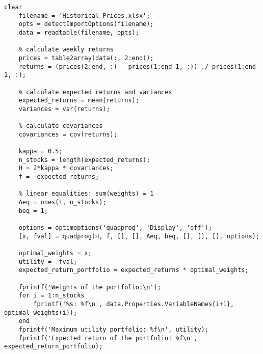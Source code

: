 \documentclass[12pt]{article}
\begin{document}
\begin{lstlisting}[label=lst:c,
    caption=Question c)]
    clear
    filename = 'Historical Prices.xlsx';
    opts = detectImportOptions(filename);
    data = readtable(filename, opts);
    
    % calculate weekly returns
    prices = table2array(data(:, 2:end));
    returns = (prices(2:end, :) - prices(1:end-1, :)) ./ prices(1:end-1, :);
    
    % calculate expected returns and variances
    expected_returns = mean(returns);
    variances = var(returns);
    
    % calculate covariances
    covariances = cov(returns);
    
    kappa = 0.5;
    n_stocks = length(expected_returns);
    H = 2*kappa * covariances;
    f = -expected_returns;
    
    % linear equalities: sum(weights) = 1
    Aeq = ones(1, n_stocks);
    beq = 1;
    
    options = optimoptions('quadprog', 'Display', 'off');
    [x, fval] = quadprog(H, f, [], [], Aeq, beq, [], [], [], options);
    
    optimal_weights = x;
    utility = -fval;
    expected_return_portfolio = expected_returns * optimal_weights;
    
    fprintf('Weights of the portfolio:\n');
    for i = 1:n_stocks
        fprintf('%s: %f\n', data.Properties.VariableNames{i+1}, optimal_weights(i));
    end
    fprintf('Maximum utility portfolio: %f\n', utility);
    fprintf('Expected return of the portfolio: %f\n', expected_return_portfolio);
\end{lstlisting}
\end{document}
